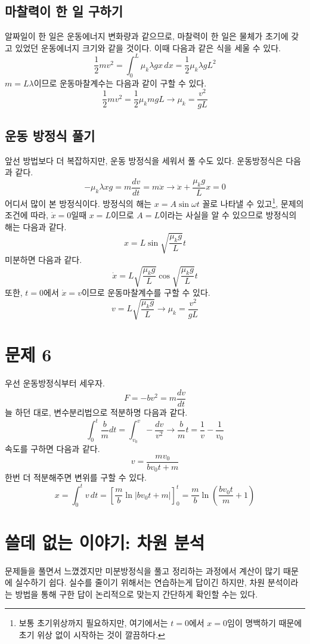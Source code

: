 \documentclass{scrartcl}
\begin{document}
\subsection{마찰력이 한 일 구하기}
알짜일이 한 일은 운동에너지 변화량과 같으므로, 마찰력이 한 일은 물체가 초기에 갖고 있었던 운동에너지 크기와 같을 것이다. 이때 다음과 같은 식을 세울 수 있다.
\[\frac{1}{2}mv^2=\int^L_0\mu_k\lambda gx\,dx=\frac{1}{2}\mu_k\lambda gL^2\]
\(m=L\lambda\)이므로 운동마찰계수는 다음과 같이 구할 수 있다.
\[\frac{1}{2}mv^2=\frac{1}{2}\mu_k mgL\longrightarrow\mu_k=\frac{v^2}{gL}\]
\[\]

\subsection{운동 방정식 풀기}
앞선 방법보다 더 복잡하지만, 운동 방정식을 세워서 풀 수도 있다. 운동방정식은 다음과 같다.
\[-\mu_k\lambda xg=m\frac{dv}{dt}=m\ddot{x}\longrightarrow \ddot{x}+\frac{\mu_k g}{L}x=0\]
어디서 많이 본 방정식이다. 방정식의 해는 \(x=A\sin\omega t\) 꼴로 나타낼 수 있고\footnote{보통 초기위상까지 필요하지만, 여기에서는 \(t=0\)에서 \(x=0\)임이 명백하기 때문에 초기 위상 없이 시작하는 것이 깔끔하다.}, 문제의 조건에 따라, \(\dot{x}=0\)일때 \(x=L\)이므로 \(A=L\)이라는 사실을 알 수 있으므로 방정식의 해는 다음과 같다.
\[x=L\sin\sqrt{\frac{\mu_k g}{L}}t\]
미분하면 다음과 같다.
\[\dot{x}=L\sqrt{\frac{\mu_k g}{L}}\cos\sqrt{\frac{\mu_k g}{L}}t\]
또한, \(t=0\)에서 \(\dot{x}=v\)이므로 운동마찰계수를 구할 수 있다.
\[v=L\sqrt{\frac{\mu_k g}{L}}\longrightarrow\mu_k=\frac{v^2}{gL}\]

\section{문제 6}
우선 운동방정식부터 세우자.
\[F=-bv^2=m\frac{dv}{dt}\]
늘 하던 대로, 변수분리법으로 적분하명 다음과 같다.
\[\int^t_0\frac{b}{m}dt=\int^v_{v_0}-\frac{dv}{v^2}\longrightarrow\frac{b}{m}t=\frac{1}{v}-\frac{1}{v_0}\]
속도를 구하면 다음과 같다.
\[v=\frac{mv_0}{bv_0t+m}\]
한번 더 적분해주면 변위를 구할 수 있다.
\[x=\int^t_0 v\,dt=\left[\frac{m}{b}\ln|bv_0 t+m|\right]^t_0=\frac{m}{b}\ln\left(\frac{bv_0 t}{m}+1\right)\]

\section{쓸데 없는 이야기: 차원 분석}
문제들을 풀면서 느꼈겠지만 미분방정식을 풀고 정리하는 과정에서 계산이 많기 때문에 실수하기 쉽다. 실수를 줄이기 위해서는 연습하는게 답이긴 하지만, 차원 분석이라는 방법을 통해 구한 답이 논리적으로 맞는지 간단하게 확인할 수는 있다.
\end{document}
